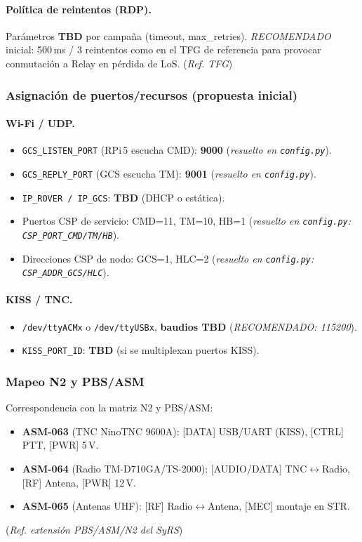 \paragraph{Política de reintentos (RDP).}
Parámetros \textbf{TBD} por campaña (timeout, max\_retries). \emph{RECOMENDADO} inicial: 500\,ms / 3 reintentos
como en el TFG de referencia para provocar conmutación a Relay en pérdida de LoS.%
(\emph{Ref. TFG})%

\subsubsection{Asignación de puertos/recursos (propuesta inicial)}
\paragraph{Wi-Fi / UDP.}
\begin{itemize}
  \item \texttt{GCS\_LISTEN\_PORT} (RPi\,5 escucha CMD): \textbf{9000}
        (\emph{resuelto en \texttt{config.py}}).
  \item \texttt{GCS\_REPLY\_PORT} (GCS escucha TM): \textbf{9001}
        (\emph{resuelto en \texttt{config.py}}).
  \item \texttt{IP\_ROVER / IP\_GCS}: \textbf{TBD} (DHCP o estática).
  \item Puertos CSP de servicio: CMD=11, TM=10, HB=1
        (\emph{resuelto en \texttt{config.py}: \texttt{CSP\_PORT\_CMD/TM/HB}}).
  \item Direcciones CSP de nodo: GCS=1, HLC=2
        (\emph{resuelto en \texttt{config.py}: \texttt{CSP\_ADDR\_GCS/HLC}}).
\end{itemize}

\paragraph{KISS / TNC.}
\begin{itemize}
  \item \texttt{/dev/ttyACMx} o \texttt{/dev/ttyUSBx}, \textbf{baudios TBD} (\emph{RECOMENDADO: 115200}).
  \item \texttt{KISS\_PORT\_ID}: \textbf{TBD} (si se multiplexan puertos KISS).
\end{itemize}

\subsubsection{Mapeo N2 y PBS/ASM}
Correspondencia con la matriz N2 y PBS/ASM:
\begin{itemize}
  \item \textbf{ASM-063} (TNC NinoTNC 9600A): [DATA] USB/UART (KISS), [CTRL] PTT, [PWR] 5\,V.
  \item \textbf{ASM-064} (Radio TM-D710GA/TS-2000): [AUDIO/DATA] TNC$\leftrightarrow$Radio, [RF] Antena, [PWR] 12\,V.
  \item \textbf{ASM-065} (Antenas UHF): [RF] Radio$\leftrightarrow$Antena, [MEC] montaje en STR.
\end{itemize}
(\emph{Ref. extensión PBS/ASM/N2 del SyRS})%

